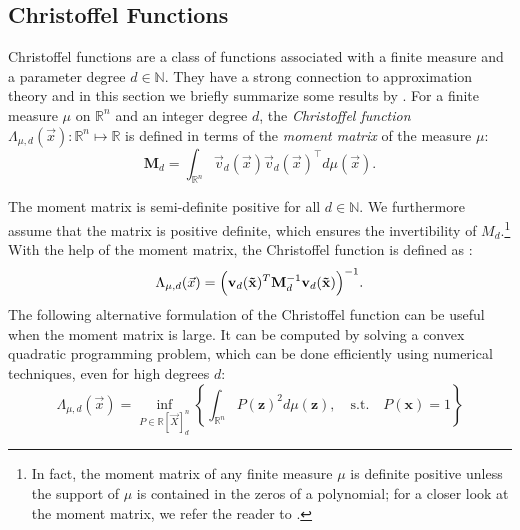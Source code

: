 \documentclass[pmlr]{jmlr}%
\begin{document}
\subsection{Christoffel Functions}
\label{Christoffel Functions}
%
Christoffel functions are a class of functions associated with a finite measure and a parameter degree $d \in \mathbb{N}$. They have a strong connection to approximation theory and in this section we briefly summarize some results by \cite{lasserre2019empirical}. 
%
For a finite measure $\mu$ on $\mathbb{R}^{n}$ and an integer degree $d$, the \emph{Christoffel function} $\Lambda_{\mu, d}( \Vec{x}):\mathbb{R}^n \mapsto \mathbb{R}$ is defined in terms of the \emph{moment matrix} of the measure $\mu$: 
$$
\mathbf{M}_d=\int_{\mathbb{R}^{n}} \Vec{v}_{d}(\Vec{x}) \Vec{v}_{d}(\Vec{x})^{\top} d \mu(\Vec{x}).$$

The moment matrix is semi-definite positive for all $d \in \mathbb{N}$. We furthermore assume that the matrix is positive definite, which ensures the invertibility of $M_d$.\footnote{In fact, the moment matrix of any finite measure $\mu$ is definite positive unless the support of $\mu$ is contained in the zeros of a polynomial; for a closer look at the moment matrix, we refer the reader to \cite{lasserre2019empirical}.} With the help of the moment matrix, the Christoffel function is defined as : 
\begin{equation}\label{eq:Christoffel}
\Lambda_{\mu, d}(\Vec{x}) = \Bigl(\mathbf{v}_{d}(\mathbf{\Vec{x}})^{T} \mathbf{M}_{d}^{-1} \mathbf{v}_{d}(\mathbf{\Vec{x}})\Bigr)^{-1}.
\end{equation}
%
The following alternative formulation of the Christoffel function can be useful when the moment matrix is large. It can be computed by solving a convex quadratic programming problem, which can be done efficiently using numerical techniques, even for high degrees $d$: 
%
$$ 
\Lambda_{\mu, d}( \Vec{x}) = \inf _{P \in \mathbb{R}[\Vec{X}]_d^n}\left\{\int_{\mathbb{R}^{n}} P(\mathbf{z})^{2} d \mu(\mathbf{z}), \quad \text {s.t.} \quad P(\mathbf{x})=1\right\}
$$
\end{document}
